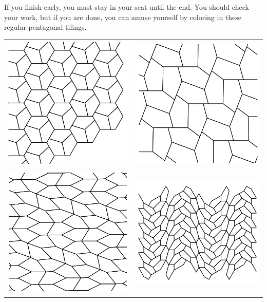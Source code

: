 \documentclass[addpoints,12pt]{exam}
\begin{document}
\newpage

If you finish early, you must stay in your seat until the end. You should check your work, but if you are done, you can amuse yourself by coloring in these regular pentagonal tilings.

\begin{tabular}{cc}
\includegraphics[width=.4\textwidth]{T1} & \includegraphics[width=.4\textwidth]{T2} \\
\includegraphics[width=.4\textwidth]{T3} &\includegraphics[width=.4\textwidth]{T15} 
\end{tabular}
\end{document}
